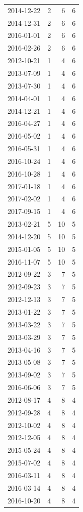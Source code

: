 \begin{tabular}{lrrr}
2014-12-22 & 2 & 6 & 6 \\
2014-12-31 & 2 & 6 & 6 \\
2016-01-01 & 2 & 6 & 6 \\
2016-02-26 & 2 & 6 & 6 \\
2012-10-21 & 1 & 4 & 6 \\
2013-07-09 & 1 & 4 & 6 \\
2013-07-30 & 1 & 4 & 6 \\
2014-04-01 & 1 & 4 & 6 \\
2014-12-21 & 1 & 4 & 6 \\
2016-04-27 & 1 & 4 & 6 \\
2016-05-02 & 1 & 4 & 6 \\
2016-05-31 & 1 & 4 & 6 \\
2016-10-24 & 1 & 4 & 6 \\
2016-10-28 & 1 & 4 & 6 \\
2017-01-18 & 1 & 4 & 6 \\
2017-02-02 & 1 & 4 & 6 \\
2017-09-15 & 1 & 4 & 6 \\
2013-02-21 & 5 & 10 & 5 \\
2014-12-20 & 5 & 10 & 5 \\
2015-01-05 & 5 & 10 & 5 \\
2016-11-07 & 5 & 10 & 5 \\
2012-09-22 & 3 & 7 & 5 \\
2012-09-23 & 3 & 7 & 5 \\
2012-12-13 & 3 & 7 & 5 \\
2013-01-22 & 3 & 7 & 5 \\
2013-03-22 & 3 & 7 & 5 \\
2013-03-29 & 3 & 7 & 5 \\
2013-04-16 & 3 & 7 & 5 \\
2013-05-08 & 3 & 7 & 5 \\
2013-09-02 & 3 & 7 & 5 \\
2016-06-06 & 3 & 7 & 5 \\
2012-08-17 & 4 & 8 & 4 \\
2012-09-28 & 4 & 8 & 4 \\
2012-10-02 & 4 & 8 & 4 \\
2012-12-05 & 4 & 8 & 4 \\
2015-05-24 & 4 & 8 & 4 \\
2015-07-02 & 4 & 8 & 4 \\
2016-03-11 & 4 & 8 & 4 \\
2016-03-14 & 4 & 8 & 4 \\
2016-10-20 & 4 & 8 & 4 \\

\end{tabular}

